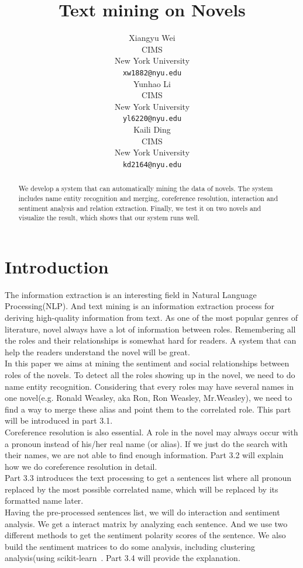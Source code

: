 \documentclass[11pt]{article}
\title{Text mining on Novels}
\author{Xiangyu Wei \\
  CIMS \\
  New York University \\
  {\tt xw1882@nyu.edu} \\\And
  Yunhao Li \\ 
  CIMS \\
  New York University \\
  {\tt yl6220@nyu.edu} \\\And
  Kaili Ding \\ 
  CIMS \\
  New York University \\
  {\tt kd2164@nyu.edu} \\}
\begin{document}
\maketitle
\begin{abstract} %
  We develop a system that can automatically mining the data of novels. The system includes name entity recognition and merging, coreference resolution, interaction and sentiment analysis and relation extraction. Finally, we test it on two novels and visualize the result, which shows that our system runs well.
\end{abstract}

\section{Introduction} %

The information extraction is an interesting field in Natural Language Processing(NLP). And text mining is an information extraction process for deriving high-quality information from text. As one of the most popular genres of literature, novel always have a lot of information between roles. Remembering all the roles and their relationships is somewhat hard for readers. A system that can help the readers understand the novel will be great. \\

In this paper we aims at mining the sentiment and social relationships between roles of the novels. To detect all the roles showing up in the novel, we need to do name entity recognition. Considering that every roles may have several names in one novel(e.g. Ronald Weasley, aka Ron, Ron Weasley, Mr.Weasley), we need to find a way to merge these alias and point them to the correlated role. This part will be introduced in part 3.1. \\

Coreference resolution is also essential. A role in the novel may always occur with a pronoun instead of his/her real name (or alias). If we just do the search with their names, we are not able to find enough information. Part 3.2 will explain how we do coreference resolution in detail.  \\

Part 3.3 introduces the text processing to get a sentences list where all pronoun replaced by the most possible correlated name, which will be replaced by its formatted name later.  \\

Having the pre-processed sentences list, we will do interaction and sentiment analysis. We get a interact matrix by analyzing each sentence. And we use two different methods to get the sentiment polarity scores of the sentence. We also build the sentiment matrices to do some analysis, including clustering analysis(using scikit-learn~\cite{sklearn_api}. Part 3.4 will provide the explanation. \\
\end{document}
